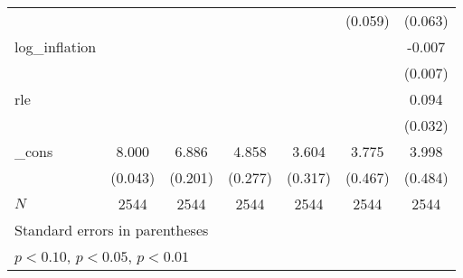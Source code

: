 {\begin{tabular}{l*{6}{c}}
            &                     &                     &                     &                     &     (0.059)         &     (0.063)         \\
\addlinespace
log\_inflation&                     &                     &                     &                     &                     &      -0.007         \\
            &                     &                     &                     &                     &                     &     (0.007)         \\
\addlinespace
rle         &                     &                     &                     &                     &                     &       0.094\sym{***}\\
            &                     &                     &                     &                     &                     &     (0.032)         \\
\addlinespace
\_cons      &       8.000\sym{***}&       6.886\sym{***}&       4.858\sym{***}&       3.604\sym{***}&       3.775\sym{***}&       3.998\sym{***}\\
            &     (0.043)         &     (0.201)         &     (0.277)         &     (0.317)         &     (0.467)         &     (0.484)         \\
\midrule
\(N\)       &        2544         &        2544         &        2544         &        2544         &        2544         &        2544         \\
\bottomrule
\multicolumn{7}{l}{\footnotesize Standard errors in parentheses}\\
\multicolumn{7}{l}{\footnotesize \sym{*} \(p<0.10\), \sym{**} \(p<0.05\), \sym{***} \(p<0.01\)}\\
\end{tabular}
}
